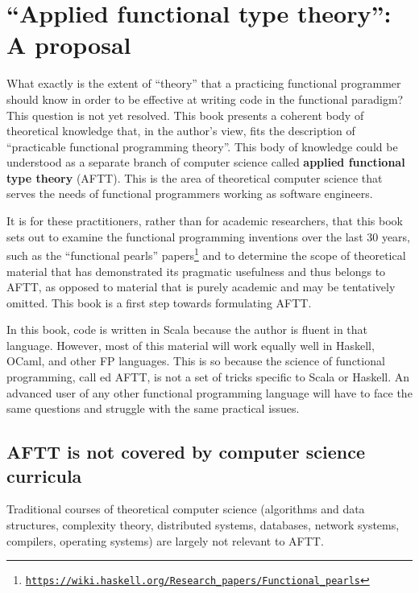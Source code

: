 
\chapter{``Applied functional type theory'': A proposal\label{chap:Applied-functional-type}}

What exactly is the extent of ``theory'' that a practicing functional
programmer should know in order to be effective at writing code in
the functional paradigm? This question is not yet resolved. This book
presents a coherent body of theoretical knowledge that, in the author's
view, fits the description of ``practicable functional programming
theory''. This body of knowledge could be understood as a separate
branch of computer science called\textbf{ applied
functional type theory} (AFTT). This is the area of theoretical computer
science that serves the needs of functional programmers working as
software engineers.

It is for these practitioners, rather than for academic researchers,
that this book sets out to examine the functional programming inventions
over the last 30 years, \textendash{} such as the \textquotedblleft functional
pearls\textquotedblright{} papers\footnote{\texttt{\href{https://wiki.haskell.org/Research_papers/Functional_pearls}{https://wiki.haskell.org/Research\_papers/Functional\_pearls}}}
\textendash{} and to determine the scope of theoretical material that
has demonstrated its pragmatic usefulness and thus belongs to AFTT,
as opposed to material that is purely academic and may be tentatively
omitted. This book is a first step towards formulating AFTT.

In this book, code is written in Scala because the author is fluent
in that language. However, most of this material will work equally
well in Haskell, OCaml, and other FP languages. This is so because
the science of functional programming, call ed AFTT, is not a set
of tricks specific to Scala or Haskell. An advanced user of any other
functional programming language will have to face the same questions
and struggle with the same practical issues.

\section{AFTT is not covered by computer science curricula}

Traditional courses of theoretical computer science (algorithms and
data structures, complexity theory, distributed systems, databases,
network systems, compilers, operating systems) are largely not relevant
to AFTT.

